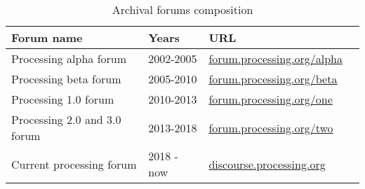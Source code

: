 \begin{table}[h]
    \raggedright
    \caption{Archival forums composition}
    \label{table:forums}
    \begin{tabular}{l l l c}
        \toprule
        Forum name & Years & URL \\
        \midrule
        Processing alpha forum & 2002-2005 & \href{https://forum.processing.org/alpha/}{forum.processing.org/alpha} \\
        Processing beta forum & 2005-2010 & \href{https://forum.processing.org/beta/}{forum.processing.org/beta}  \\
        Processing 1.0 forum & 2010-2013 & \href{https://forum.processing.org/one/}{forum.processing.org/one} \\
        Processing 2.0 and 3.0 forum & 2013-2018 & \href{https://forum.processing.org/two/}{forum.processing.org/two} \\
        Current processing forum & 2018 - now & \href{https://discourse.processing.org/}{discourse.processing.org} \\
        \bottomrule
    \end{tabular}
  \end{table}